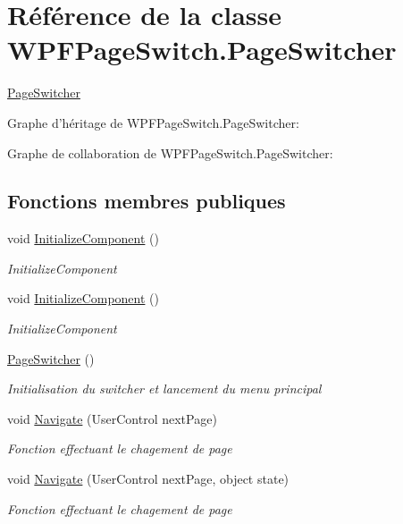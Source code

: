 \hypertarget{class_w_p_f_page_switch_1_1_page_switcher}{\section{Référence de la classe W\+P\+F\+Page\+Switch.\+Page\+Switcher}
\label{class_w_p_f_page_switch_1_1_page_switcher}
}


\hyperlink{class_w_p_f_page_switch_1_1_page_switcher}{Page\+Switcher}  




Graphe d'héritage de W\+P\+F\+Page\+Switch.\+Page\+Switcher\+:


Graphe de collaboration de W\+P\+F\+Page\+Switch.\+Page\+Switcher\+:
\subsection*{Fonctions membres publiques}
\begin{DoxyCompactItemize}
\item 
void \hyperlink{class_w_p_f_page_switch_1_1_page_switcher_a509631b93e88b2d86c2c4b19637db12b}{Initialize\+Component} ()
\begin{DoxyCompactList}\small\item\em Initialize\+Component \end{DoxyCompactList}\item 
void \hyperlink{class_w_p_f_page_switch_1_1_page_switcher_a509631b93e88b2d86c2c4b19637db12b}{Initialize\+Component} ()
\begin{DoxyCompactList}\small\item\em Initialize\+Component \end{DoxyCompactList}\item 
\hyperlink{class_w_p_f_page_switch_1_1_page_switcher_a11ddf72adcca16ab0cdc1437b762e46f}{Page\+Switcher} ()
\begin{DoxyCompactList}\small\item\em Initialisation du switcher et lancement du menu principal \end{DoxyCompactList}\item 
void \hyperlink{class_w_p_f_page_switch_1_1_page_switcher_a4d77546e87edd3b1d8474f5d85cd8bee}{Navigate} (User\+Control next\+Page)
\begin{DoxyCompactList}\small\item\em Fonction effectuant le chagement de page \end{DoxyCompactList}\item 
void \hyperlink{class_w_p_f_page_switch_1_1_page_switcher_af0120b3db95431cb81652081ff0f2ba4}{Navigate} (User\+Control next\+Page, object state)
\begin{DoxyCompactList}\small\item\em Fonction effectuant le chagement de page \end{DoxyCompactList}\end{DoxyCompactItemize}


